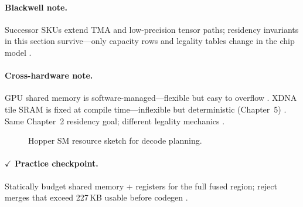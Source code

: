 \paragraph{Blackwell note.}
Successor SKUs extend TMA and low-precision tensor paths; residency invariants in this section survive---only capacity rows and legality tables change in the chip model \citep{liu2024deepseekv3,yirage2026,patel2025llminference}.

\paragraph{Cross-hardware note.}
GPU shared memory is software-managed---flexible but easy to overflow \citep{nvidia2022hopper}.
XDNA tile SRAM is fixed at compile time---inflexible but deterministic (Chapter~5) \citep{amd2024xdna,amd2024aie}.
Same Chapter~2 residency goal; different legality mechanics \citep{chen2020compilerbasedhardw}.

\begin{figure}[t]
\centering
{}
\caption{Hopper SM resource sketch for decode planning.}
\label{fig:hopper_sm_resources}
\end{figure}

\paragraph{$\checkmark$ Practice checkpoint.}
Statically budget shared memory + registers for the full fused region; reject merges that exceed 227\,KB usable before codegen \citep{yirage2026,memoryfloor2026}.


